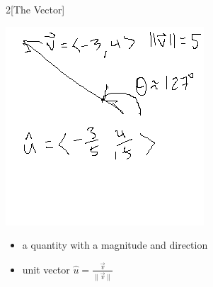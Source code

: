 \documentclass[11pt]{article}
\theoremstyle{definition}
\newcommand{\col}[1]{\begin{minipage}{\columnwidth}#1\end{minipage}}
\begin{document}
\begin{multicols}{2}[The Vector]
  \col{
    \centering
    \includegraphics{vector.png}
  }
  \col{
    \begin{itemize}
      \item a quantity with a magnitude and direction
      \item unit vector $\displaystyle\hat{u} =\frac{\vec{v}}{\lVert \vec{v} \rVert}$
    \end{itemize}
  }
\end{multicols}
\end{document}
